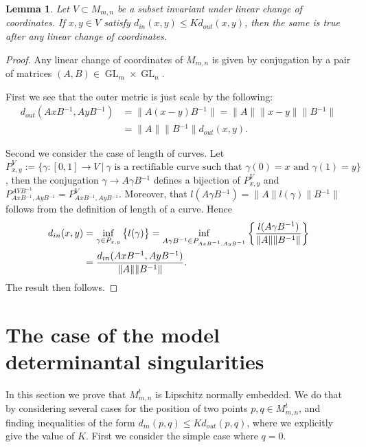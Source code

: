 \documentclass[a4paper,oneside]{amsart}
\newtheorem{lemma}[thm]{Lemma}
\theoremstyle{definition}
\begin{document}
\begin{lemma}\label{chageofcoordinates}
Let $V\subset M_{m,n}$ be a subset invariant under linear change of
coordinates. If $x,y\in V$ satisfy $d_{in}(x,y)\leq Kd_{out}(x,y)$,
then the same is true after any linear change of coordinates.
\end{lemma}
\begin{proof}
Any linear change of coordinates of $M_{m,n}$ is given by conjugation
by a pair of matrices $(A,B)\in{\operatorname{GL}}_m\times{\operatorname{GL}}_n$. 

First we see that the outer metric is just scale by the following:
\begin{align*}
d_{out}(AxB{^{-1}},AyB{^{-1}}) &={\lVert {A(x-y)B{^{-1}}} \rVert}
={\lVert {A} \rVert}{\lVert {x-y} \rVert}{\lVert {B{^{-1}}} \rVert}\\ &={\lVert {A} \rVert}{\lVert {B{^{-1}}} \rVert}d_{out}(x,y). 
\end{align*}

Second we consider the case of length of curves. Let $P^V_{x,y}:=\{
{ {\gamma} \colon {[0,1]} \to {V}}\ \vert\ \gamma\text{ is a
  rectifiable curve such that } \gamma(0)=x
\text{ and } \gamma(1)=y\}$, then the conjugation $\gamma\to A\gamma B{^{-1}}$
defines a bijection of $P^V_{x,y}$ and $P^{AVB{^{-1}}}_{AxB{^{-1}},AyB{^{-1}}} =
P^V_{AxB{^{-1}},AyB{^{-1}}}$. Moreover, that 
$l(A\gamma B{^{-1}})={\lVert {A} \rVert}l(\gamma){\lVert {B{^{-1}}} \rVert}$ follows from the
definition of length of a curve. Hence
\begin{align*}
d_{in}(x,y) &= \inf_{\gamma\in P_{x,y}} \big{\{} l(\gamma) \big{\}} = 
\inf_{A\gamma B{^{-1}} \in P_{AxB{^{-1}},AyB{^{-1}}}} \bigg{\{} \frac{l(A\gamma
  B{^{-1}})}{{\lVert {A} \rVert}{\lVert {B{^{-1}}} \rVert}} \bigg{\}}\\ &=
  \frac{d_{in}(AxB{^{-1}},AyB{^{-1}})}{{\lVert {A} \rVert}{\lVert {B{^{-1}}} \rVert}}.
\end{align*}
The result then follows.
\end{proof}

\section{The case of the model determinantal singularities}\label{modelcase}

In this section we prove that ${M^{ {t} }_{m,n}}$ is Lipschitz normally
embedded. We do that by considering several cases for the position of
two points $p,q\in {M^{ {t} }_{m,n}}$, and finding inequalities of the form
$d_{in}(p,q) \leq K d_{out}(p,q)$, where we explicitly give the value
of $K$. First we consider the simple case
where $q=0$. 
\end{document}
